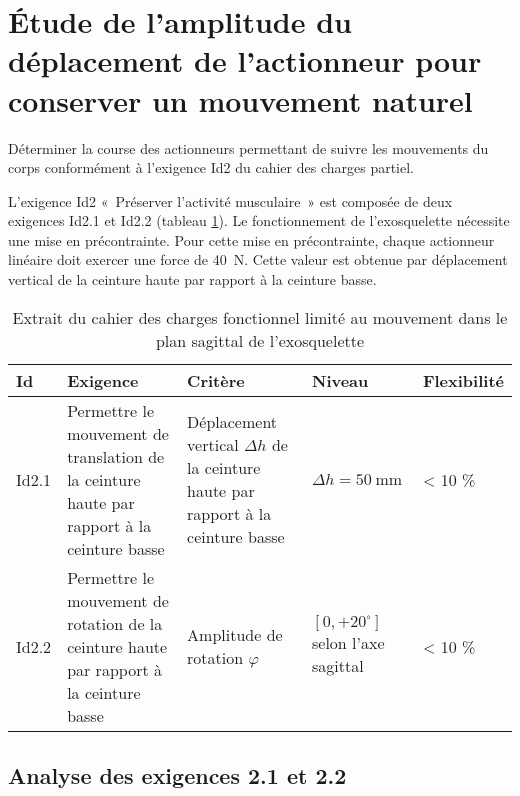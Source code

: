 
\section{Étude de l'amplitude du déplacement de l'actionneur pour conserver un mouvement naturel} %
\begin{obj}
Déterminer la course des actionneurs permettant de suivre les mouvements du corps conformément à l'exigence Id2 du cahier des charges partiel.
\end{obj}


L'exigence Id2 «~Préserver l'activité musculaire~» est composée de deux exigences Id2.1 et Id2.2 (tableau \ref{ccs_mp_2023_tab_02}). Le fonctionnement de l'exosquelette nécessite une mise en précontrainte. Pour cette mise en précontrainte, chaque actionneur linéaire doit exercer une force de \SI{40}{N}. Cette valeur est obtenue par déplacement vertical de la ceinture haute par rapport à la ceinture basse.

\begin{table}[h]
\begin{center}
\begin{tabular}{lp{5cm}p{5cm}p{2.5cm}l}
\hline
Id & Exigence & Critère & Niveau & Flexibilité \\
\hline
Id2.1 & Permettre le mouvement de translation de la ceinture haute par rapport à la ceinture basse & Déplacement vertical $\Delta h$ de la ceinture haute par rapport à la ceinture basse & $\Delta h=50 \mathrm{~mm}$ & < 10 \% \\
\hline
Id2.2 & Permettre le mouvement de rotation de la ceinture haute par rapport à la ceinture basse & Amplitude de rotation $\varphi$ &  $[0,+20^{\circ}]$  selon l'axe sagittal & < 10 \% \\
\hline
\end{tabular}
\caption{\label{ccs_mp_2023_tab_02}Extrait du cahier des charges fonctionnel limité au mouvement dans le plan sagittal de l'exosquelette}
\end{center}
\end{table}

\subsection{Analyse des exigences 2.1 et 2.2} %


